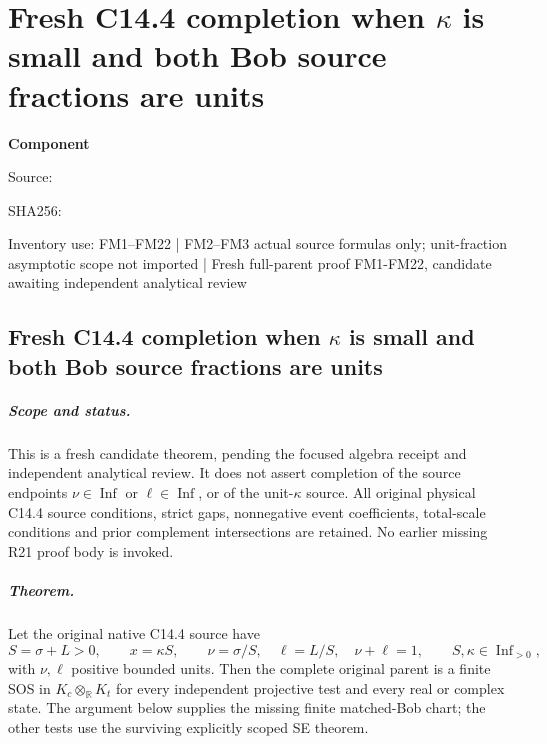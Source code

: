 \chapter{Fresh C14.4 completion when $\kappa$ is small and both Bob source fractions are units}
\label{component:p2edb55cd1f69}
\noindent\textbf{Component }\par
{\small\noindent Source: \par}
{\small\noindent SHA256: \par}
{\small\noindent Inventory use: FM1--FM22 | FM2–FM3 actual source formulas only; unit-fraction asymptotic scope not imported | Fresh full-parent proof FM1-FM22, candidate awaiting independent analytical review\par}
\medskip
\section{Fresh C14.4 completion when $\kappa$ is small and both Bob source fractions are units}
\label{p2edb55cd1f69:sec:new-c144-finite-matched}

\paragraph{Scope and status.}
This is a fresh candidate theorem, pending the focused algebra receipt
and independent analytical review. It does not assert completion of
the source endpoints $\nu\in\operatorname{Inf}$ or
$\ell\in\operatorname{Inf}$, or of the unit-$\kappa$ source.
All original physical C14.4 source conditions, strict gaps,
nonnegative event coefficients, total-scale conditions and prior
complement intersections are retained. No earlier missing R21 proof
body is invoked.

\paragraph{Theorem.}
Let the original native C14.4 source have
\[
 S=\sigma+L>0,\qquad x=\kappa S,\qquad
 \nu=\sigma/S,\quad\ell=L/S,\quad\nu+\ell=1,
 \qquad S,\kappa\in\operatorname{Inf}_{>0},
 \tag{FM1}
\]
with $\nu,\ell$ positive bounded units. Then the complete original
parent is a finite SOS in $K_c\otimes_{\mathbb R}K_t$ for every
independent projective test and every real or complex state.
The argument below supplies the missing finite matched-Bob chart;
the other tests use the surviving explicitly scoped SE theorem.

